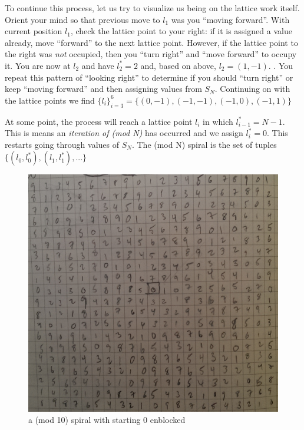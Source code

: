 \documentclass[11pt]{amsart}
\theoremstyle{mydef}
\begin{document}
To continue this process, let us try to visualize us being on the lattice work itself. Orient your mind so that previous move to $l_1$ was you ``moving forward''. With current position $l_1$, check the lattice point to your right: if it is assigned a value already, move ``forward'' to the next lattice point. However, if the lattice point to the right was \emph{not} occupied, then you ``turn right'' and ``move forward'' to occupy it. You are now at $l_2$ and have $l^*_2 = 2$ and, based on above, $l_2 = (1, -1)$. . You repeat this pattern of ``looking right'' to determine if you should ``turn right'' or keep ``moving forward'' and then assigning values from $S_N$. Continuing on with the lattice points we find $\{ l_i \}^{6}_{i=3} = \{  (0, -1), (-1, -1), (-1, 0), (-1, 1) \}$

At some point, the process will reach a lattice point $l_i$ in which $l^*_{i-1} = N-1$. This is means an \textit{iteration of (mod N)} has occurred and we assign $l^*_i = 0$. This restarts going through values of $S_N$. The (mod N) spiral is the set of tuples $\{ (l_0, l^*_0), (l_1, l^*_1), ... \}$ 





\begin{figure}[h]
\centering
\includegraphics[scale=0.3]{mod10.png}
\caption{a (mod 10) spiral with starting 0 enblocked}
\label{fig:mod10}
\end{figure}
\end{document}

